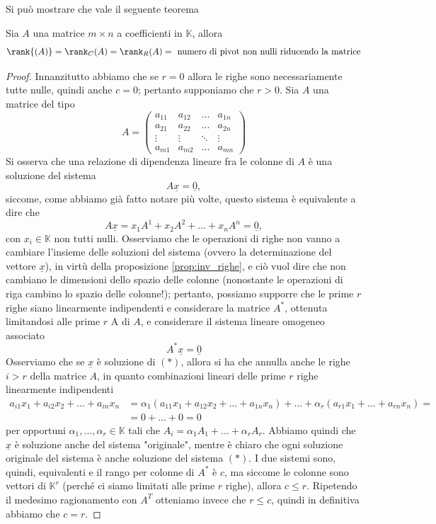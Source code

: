 Si può mostrare che vale il seguente teorema
\begin{theorem}
  Sia $A$ una matrice $m \times n$ a coefficienti in $\mathbb{K}$, allora
  $$
    \rank{(A)} = \rank_C{(A)} = \rank_R{(A)} = \text{ numero di pivot non nulli riducendo la matrice}
  $$
\end{theorem}
\begin{proof}
  Innanzitutto abbiamo che se $r = 0$ allora le righe sono necessariamente tutte nulle, quindi anche $c = 0$; pertanto supponiamo che $r > 0$. Sia $A$ una matrice del tipo
  $$
    A = \begin{pmatrix}
      a_{11} & a_{12} & \ldots & a_{1n} \\
      a_{21} & a_{22} & \ldots & a_{2n} \\
      \vdots & \vdots & \ddots & \vdots \\
      a_{m1} & a_{m2} & \ldots & a_{mn}
    \end{pmatrix}
  $$
  Si osserva che una relazione di dipendenza lineare fra le colonne di $A$ è una soluzione del sistema
  $$
    A\underline{x} = \underline{0},
  $$
  siccome, come abbiamo già fatto notare più volte, questo sistema è equivalente a dire che
  $$
    A\underline{x} = x_1 A^1 + x_2 A^2 + \ldots + x_n A^n = \underline{0},
  $$
  con $x_i \in \mathbb{K}$ non tutti nulli. Osserviamo che le operazioni di righe non vanno a cambiare l'insieme delle soluzioni del sistema (ovvero la determinazione del vettore $\underline{x}$), in virtù della proposizione \ref{prop:inv_righe}, e ciò vuol dire che non cambiano le dimensioni dello spazio delle colonne (nonostante le operazioni di riga cambino lo spazio delle colonne!);
  pertanto, possiamo supporre che le prime $r$ righe siano linearmente indipendenti e considerare la matrice $A^*$, ottenuta limitandosi alle prime $r$ A di $A$, e considerare il sistema lineare omogeneo associato
  \begin{equation*}
    A^* \underline{x} = \underline{0} \tag{$\ast$}
  \end{equation*}
  Osserviamo che se $\underline{x}$ è soluzione di $(\ast)$, allora si ha che annulla anche le righe $i > r$ della matrice $A$, in quanto combinazioni lineari delle prime $r$ righe linearmente indipendenti
  \begin{align}
    a_{i1} x_1 + a_{i2} x_2 + \ldots + a_{in} x_n &= \alpha_{1} (a_{11} x_1 + a_{12} x_2 + \ldots + a_{1n} x_n) + \ldots + \alpha_r(a_{r1} x_1 + \ldots + a_{rn} x_n) = \\
    &= 0 + \ldots + 0 = 0
  \end{align}
  per opportuni $\alpha_1, \ldots, \alpha_r \in \mathbb{K}$ tali che $A_i = \alpha_1 A_1 + \ldots + \alpha_r A_r$. Abbiamo quindi che $\underline{x}$ è soluzione anche del sistema "originale", mentre è chiaro che ogni soluzione originale del sistema è anche soluzione del sistema $(\ast)$. I due sistemi sono, quindi, equivalenti e il rango per colonne di $A^*$ è $c$, ma siccome le colonne sono vettori di $\mathbb{K}^r$ (perché ci siamo limitati alle prime $r$ righe), allora $c \leq r$.
  Ripetendo il medesimo ragionamento con $A^T$ otteniamo invece che $r \leq c$, quindi in definitiva abbiamo che $c = r$.
\end{proof}
